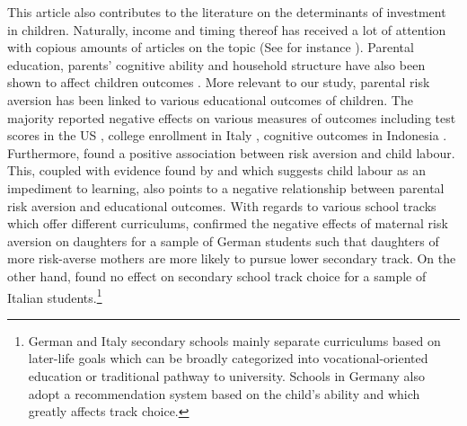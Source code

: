 \documentclass[emulatestandardclasses, 10pt, abstract = true]{scrartcl}
\begin{document}
This article also contributes to the literature on the determinants of investment in children. Naturally, income and timing thereof has received a lot of attention with copious amounts of articles on the topic (See for instance \citet{brooks1997effects, yeung2002money, carneiro2003human,dahl2012impact, carneiro2016partial, attanasio2020human}). Parental education, parents' cognitive ability and household structure have also been shown to affect children outcomes \citep{chevalier2004parental, brown2004family, guryan2008parental, schady2011parents}. More relevant to our study, parental risk aversion has been linked to various educational outcomes of children. The majority reported negative effects on various measures of outcomes including test scores in the US \citep{brown2012parental}, college enrollment in Italy \citep{checchi2014parents}, cognitive outcomes in Indonesia \citep{hartarto2023parental}. Furthermore, \citet{frempong2021risk} found a positive association between risk aversion and child labour. This, coupled with evidence found by \citet{HEADY2003385} and \citet{bezerra2009impact} which suggests child labour as an impediment to learning, also points to a negative relationship between parental risk aversion and educational outcomes. With regards to various school tracks which offer different curriculums, \citet{wolfel2012parental} confirmed the negative effects of maternal risk aversion on daughters for a sample of German students such that daughters of more risk-averse mothers are more likely to pursue lower secondary track. On the other hand, \citet{leonardi2007parents} found no effect on secondary school track choice for a sample of Italian students.\footnote{German and Italy secondary schools mainly separate curriculums based on later-life goals which can be broadly categorized into vocational-oriented education or traditional pathway to university. Schools in Germany also adopt a recommendation system based on the child's ability and which greatly affects track choice.}   
\end{document}
